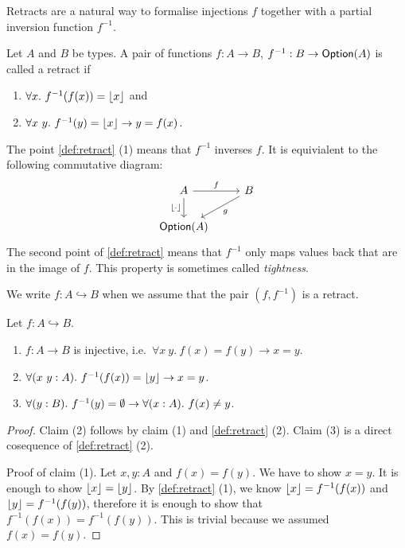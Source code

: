 Retracts are a natural way to formalise injections $f$ together with a partial inversion function $f^{-1}$.

\begin{definition}[Retract]
  \label{def:retract}
  Let $A$ and $B$ be types.  A pair of functions $f : A \to B$, $f^{-1} : B \rightarrow \textsf{Option}(A)$ is called a retract if

  \begin{enumerate}
  \item $\forall x.~f^{-1}(f(x)) = \left\lfloor {x} \right\rfloor$ and
  \item $\forall x~y.~f^{-1}(y) = \left\lfloor {x} \right\rfloor \rightarrow y = f(x)$.
  \end{enumerate}
\end{definition}

The point \ref{def:retract} (1) means that $f^{-1}$ inverses $f$.  It is equivialent to the following commutative diagram:
\[
  \begin{tikzcd}
    A \arrow[r, "f"] \arrow[d, "\Some \cdot", swap] & B \arrow[ld, "g"] \\
    \Option(A) &
  \end{tikzcd}
\]
The second point of \ref{def:retract} means that $f^{-1}$ only maps values back that are in the image of $f$.  This property is sometimes called
\emph{tightness}.

We write $f : A \hookrightarrow B$ when we assume that the pair $(f, f^{-1})$ is a retract.


\begin{lemma}
  \label{lem:retracts-basic}
  Let $f : A \hookrightarrow B$.
  \begin{enumerate}
  \item $f : A \to B$ is injective, i.e.\ $\forall x~y.~f(x)=f(y) \rightarrow x=y$.
  \item $\forall (x~y:A).~f^{-1}(f(x)) = \left\lfloor {y} \right\rfloor \rightarrow x=y$.
  \item $\forall (y:B).~f^{-1}(y) = \emptyset \rightarrow \forall (x:A).~f(x) \neq y$.
  \end{enumerate}
\end{lemma}

\begin{proof}
  Claim (2) follows by claim (1) and \ref{def:retract} (2).  Claim (3) is a direct cosequence of \ref{def:retract} (2).

  Proof of claim (1).  Let $x, y: A$ and $f(x)=f(y)$.  We have to show $x=y$.  It is enough to show $\left\lfloor {x} \right\rfloor = \left\lfloor {y} \right\rfloor$.  By \ref{def:retract} (1), we
  know $\left\lfloor {x} \right\rfloor = f^{-1}(f(x))$ and $\left\lfloor {y} \right\rfloor = f^{-1}(f(y))$, therefore it is enough to show that $f^{-1}(f(x)) = f^{-1}(f(y))$.  This is trivial
  because we assumed $f(x)=f(y)$.
\end{proof}

